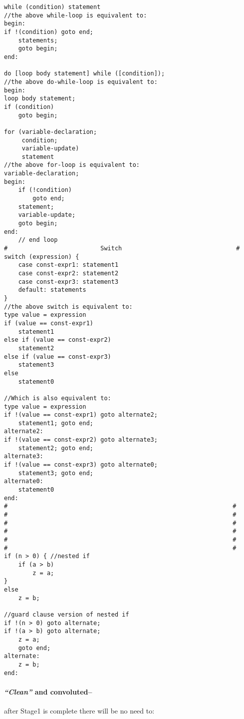 \begin{verbatim}
while (condition) statement
//the above while-loop is equivalent to:
begin:
if !(condition) goto end;
    statements;
    goto begin;
end:

do [loop body statement] while ([condition]);
//the above do-while-loop is equivalent to:
begin:
loop body statement;
if (condition)
    goto begin;

for (variable-declaration;
     condition;
     variable-update)
     statement
//the above for-loop is equivalent to:
variable-declaration;
begin:
    if (!condition)
        goto end;
    statement;
    variable-update;
    goto begin;
end:
    // end loop 
#                          Switch                                #
switch (expression) {
    case const-expr1: statement1
    case const-expr2: statement2
    case const-expr3: statement3
    default: statements
}
//the above switch is equivalent to:
type value = expression
if (value == const-expr1)
    statement1
else if (value == const-expr2)
    statement2
else if (value == const-expr3)
    statement3
else
    statement0

//Which is also equivalent to:
type value = expression
if !(value == const-expr1) goto alternate2;
    statement1; goto end;
alternate2:
if !(value == const-expr2) goto alternate3;
    statement2; goto end;
alternate3:
if !(value == const-expr3) goto alternate0;
    statement3; goto end;
alternate0:
    statement0
end:
#                                                               #
#                                                               #
#                                                               #
#                                                               #
#                                                               #
#                                                               #
if (n > 0) { //nested if
    if (a > b)
        z = a;
}
else
    z = b;

//guard clause version of nested if
if !(n > 0) goto alternate;
if !(a > b) goto alternate;
    z = a;
    goto end;
alternate:
    z = b;
end:
\end{verbatim}

\hypertarget{clean-and-convoluted}{%
\paragraph{\texorpdfstring{\emph{``Clean''} and
convoluted--}{``Clean'' and convoluted--}}\label{clean-and-convoluted}}

after Stage1 is complete there will be no need to:

